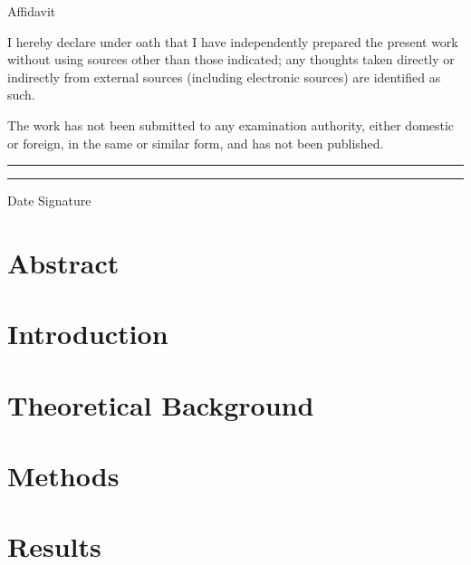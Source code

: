 \documentclass[12pt, bibliography=totoc]{scrartcl}
\begin{document}
    \newpage

    \begin{Huge}
        \centerline{Affidavit}
    \end{Huge}

    \vspace{2cm}

    \begin{Large}

        I hereby declare under oath that I have independently prepared the present work without using sources other than those indicated; any thoughts taken directly or indirectly from external sources (including electronic sources) are identified as such.

        The work has not been submitted to any examination authority, either domestic or foreign, in the same or similar form, and has not been published.

    \end{Large}

    \vfill

    \rule{4cm}{0.5mm} \tab \qquad \qquad \rule{4cm}{0.5mm}

    Date \tab \qquad \qquad Signature

    \newpage
    \doublespacing
    \tableofcontents

    \newpage
    \onehalfspacing


    \section{Abstract}\label{sec:abstract}


    \section{Introduction}
    \label{sec:introduction}
    


    \section{Theoretical Background}
    \label{sec:background}
    


    \section{Methods}
    \label{sec:methods}
    


    \section{Results}
    \label{sec:results}
    
\end{document}
